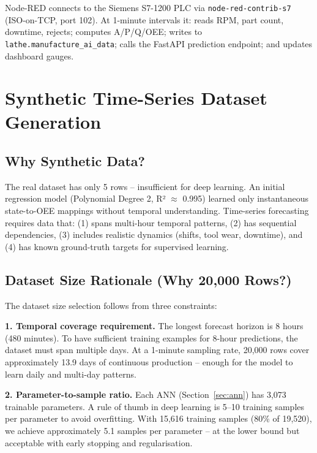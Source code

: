 \documentclass[a4paper,11pt]{article}
\begin{document}
Node-RED connects to the Siemens S7-1200 PLC via \texttt{node-red-contrib-s7} (ISO-on-TCP, port 102). At 1-minute intervals it: reads RPM, part count, downtime, rejects; computes A/P/Q/OEE; writes to \texttt{lathe.manufacture\_ai\_data}; calls the FastAPI prediction endpoint; and updates dashboard gauges.

\section{Synthetic Time-Series Dataset Generation}

\subsection{Why Synthetic Data?}

The real dataset has only 5 rows -- insufficient for deep learning. An initial regression model (Polynomial Degree 2, R² $\approx$ 0.995) learned only instantaneous state-to-OEE mappings without temporal understanding. Time-series forecasting requires data that: (1) spans multi-hour temporal patterns, (2) has sequential dependencies, (3) includes realistic dynamics (shifts, tool wear, downtime), and (4) has known ground-truth targets for supervised learning.

\subsection{Dataset Size Rationale (Why 20,000 Rows?)}

The dataset size selection follows from three constraints:

\textbf{1. Temporal coverage requirement.} The longest forecast horizon is 8 hours (480 minutes). To have sufficient training examples for 8-hour predictions, the dataset must span multiple days. At a 1-minute sampling rate, 20,000 rows cover approximately 13.9 days of continuous production -- enough for the model to learn daily and multi-day patterns.

\textbf{2. Parameter-to-sample ratio.} Each ANN (Section~\ref{sec:ann}) has 3,073 trainable parameters. A rule of thumb in deep learning is 5--10 training samples per parameter to avoid overfitting. With 15,616 training samples (80\% of 19,520), we achieve approximately 5.1 samples per parameter -- at the lower bound but acceptable with early stopping and regularisation.
\end{document}
